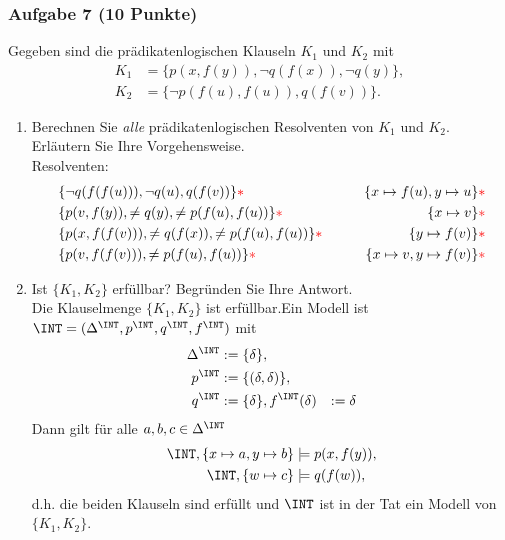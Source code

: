 \subsubsection*{Aufgabe 7 (10 Punkte)}
Gegeben sind die prädikatenlogischen Klauseln $K_1$ und $K_2$ mit 
\begin{align*}
K_1 &= \{p(x,f(y)), \neg q(f(x)), \neg q(y)\}, \\
K_2 &= \{\neg p(f(u), f(u)), q(f(v))\}.
\end{align*}
\begin{enumerate}
\item Berechnen Sie \textit{alle} prädikatenlogischen Resolventen von $K_1$ und $K_2$. Erläutern Sie Ihre Vorgehensweise. \\
\LOES Resolventen:
\begin{align*}
&\{\neg q(f(f(u))), \neg q(u), q(f(v)) \}{\textcolor{red}{* }} \qquad &\{x \mapsto f(u), y \mapsto u\}{\textcolor{red}{* }} \\
&\{p(v,f(y)), \neq q(y), \neq p(f(u),f(u)) \}{\textcolor{red}{* }} \qquad &\{x \mapsto v\}{\textcolor{red}{* }} \\
&\{p(x,f(f(v))), \neq q(f(x)), \neq p(f(u),f(u)) \}{\textcolor{red}{* }} \qquad &\{y \mapsto f(v)\}{\textcolor{red}{* }} \\
&\{p(v,f(f(v))), \neq p(f(u),f(u)) \}{\textcolor{red}{* }} \qquad &\{x \mapsto v, y \mapsto f(v)\}{\textcolor{red}{* }} \\
\end{align*}
\item Ist $\{K_1, K_2\}$ erfüllbar? Begründen Sie Ihre Antwort. \\
\LOES Die Klauselmenge $\{K_1, K_2\}$ ist erfüllbar.\POINT Ein Modell ist $\INT = (\Delta^{\INT}, p^{\INT}, q^{\INT}, f^{\INT})$ mit 
\begin{align*}
\Delta^{\INT} &:= \{\delta\}, \\
p^{\INT} &:= \{(\delta,\delta)\}, \\
q^{\INT} &:= \{\delta\},
f^{\INT}(\delta) &:= \delta
\end{align*}
Dann gilt für alle $a,b,c \in \Delta^{\INT}$
\begin{align*}
\INT, \{x \mapsto a, y \mapsto b\} &\models p(x,f(y)),\\
\INT, \{w \mapsto c\} &\models q(f(w)),
\end{align*}
d.h. die beiden Klauseln sind erfüllt und $\INT$ ist in der Tat ein Modell von $\{K_1, K_2\}$.\POINT
\end{enumerate}

